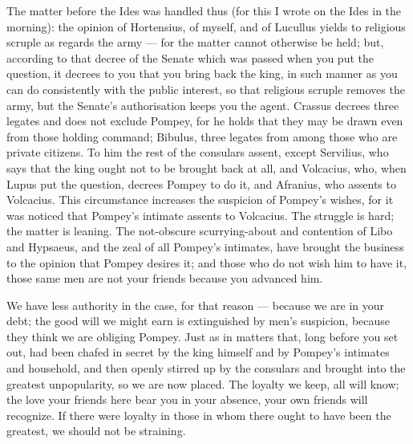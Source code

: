  The matter before the Ides was handled thus (for this I wrote on the Ides in the morning): the opinion of Hortensius, of myself, and of Lucullus yields to religious scruple as regards the army --- for the matter cannot otherwise be held; but, according to that decree of the Senate which was passed when you put the question, it decrees to you that you bring back the king, in such manner as you can do consistently with the public interest, so that religious scruple removes the army, but the Senate's authorisation keeps you the agent. Crassus decrees three legates and does not exclude Pompey, for he holds that they may be drawn even from those holding command; Bibulus, three legates from among those who are private citizens. To him the rest of the consulars assent, except Servilius, who says that the king ought not to be brought back at all, and Volcacius, who, when Lupus put the question, decrees Pompey to do it, and Afranius, who assents to Volcacius. This circumstance increases the suspicion of Pompey's wishes, for it was noticed that Pompey's intimate assents to Volcacius. The struggle is hard; the matter is leaning. The not-obscure scurrying-about and contention of Libo and Hypsaeus, and the zeal of all Pompey's intimates, have brought the business to the opinion that Pompey desires it; and those who do not wish him to have it, those same men are not your friends because you advanced him.

 We have less authority in the case, for that reason --- because we are in your debt; the good will we might earn is extinguished by men's suspicion, because they think we are obliging Pompey. Just as in matters that, long before you set out, had been chafed in secret by the king himself and by Pompey's intimates and household, and then openly stirred up by the consulars and brought into the greatest unpopularity, so we are now placed. The loyalty we keep, all will know; the love your friends here bear you in your absence, your own friends will recognize. If there were loyalty in those in whom there ought to have been the greatest, we should not be straining.
